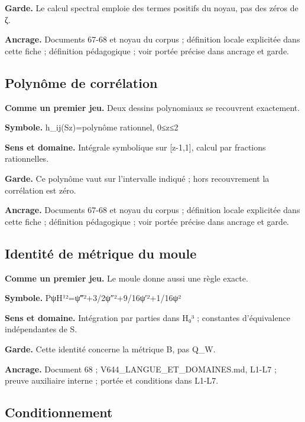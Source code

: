 \documentclass[
  9pt,
  a4paper,
]{article}
\begin{document}
\textbf{Garde.} Le calcul spectral emploie des termes positifs du noyau,
pas des zéros de ζ.

\textbf{Ancrage.} Documents 67-68 et noyau du corpus ; définition locale
explicitée dans cette fiche ; définition pédagogique ; voir portée
précise dans ancrage et garde.

\hypertarget{polynuxf4me-de-corruxe9lation}{%
\subsection{Polynôme de
corrélation}\label{polynuxf4me-de-corruxe9lation}}

\textbf{Comme un premier jeu.} Deux dessins polynomiaux se recouvrent
exactement.

\textbf{Symbole.} h\_ij(Sz)=polynôme rationnel, 0≤z≤2

\textbf{Sens et domaine.} Intégrale symbolique sur {[}z-1,1{]}, calcul
par fractions rationnelles.

\textbf{Garde.} Ce polynôme vaut sur l'intervalle indiqué ; hors
recouvrement la corrélation est zéro.

\textbf{Ancrage.} Documents 67-68 et noyau du corpus ; définition locale
explicitée dans cette fiche ; définition pédagogique ; voir portée
précise dans ancrage et garde.

\hypertarget{identituxe9-de-muxe9trique-du-moule}{%
\subsection{Identité de métrique du
moule}\label{identituxe9-de-muxe9trique-du-moule}}

\textbf{Comme un premier jeu.} Le moule donne aussi une règle exacte.

\textbf{Symbole.}
\textbar\textbar Pψ\textbar\textbar H¹²=\textbar\textbar ψ‴\textbar\textbar²+3/2\textbar\textbar ψ″\textbar\textbar²+9/16\textbar\textbar ψ′\textbar\textbar²+1/16\textbar\textbar ψ\textbar\textbar²

\textbf{Sens et domaine.} Intégration par parties dans H₀³ ; constantes
d'équivalence indépendantes de S.

\textbf{Garde.} Cette identité concerne la métrique B, pas Q\_W.

\textbf{Ancrage.} Document 68 ; V644\_LANGUE\_ET\_DOMAINES.md, L1-L7 ;
preuve auxiliaire interne ; portée et conditions dans L1-L7.

\hypertarget{conditionnement}{%
\subsection{Conditionnement}\label{conditionnement}}
\end{document}
